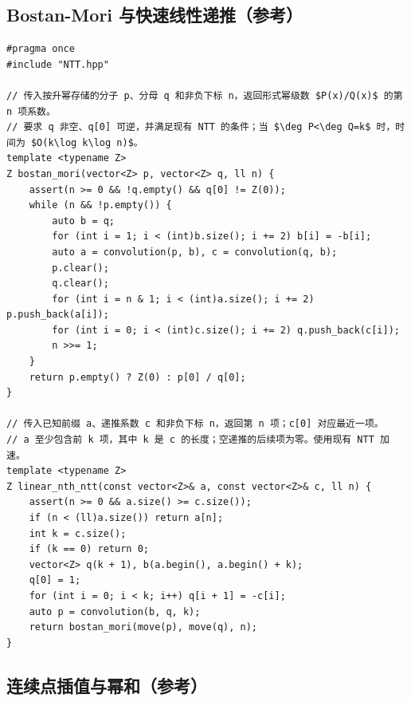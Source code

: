 \subsection{Bostan-Mori 与快速线性递推（参考）}
\par

\begin{lstlisting}
#pragma once
#include "NTT.hpp"

// 传入按升幂存储的分子 p、分母 q 和非负下标 n，返回形式幂级数 $P(x)/Q(x)$ 的第 n 项系数。
// 要求 q 非空、q[0] 可逆，并满足现有 NTT 的条件；当 $\deg P<\deg Q=k$ 时，时间为 $O(k\log k\log n)$。
template <typename Z>
Z bostan_mori(vector<Z> p, vector<Z> q, ll n) {
    assert(n >= 0 && !q.empty() && q[0] != Z(0));
    while (n && !p.empty()) {
        auto b = q;
        for (int i = 1; i < (int)b.size(); i += 2) b[i] = -b[i];
        auto a = convolution(p, b), c = convolution(q, b);
        p.clear();
        q.clear();
        for (int i = n & 1; i < (int)a.size(); i += 2) p.push_back(a[i]);
        for (int i = 0; i < (int)c.size(); i += 2) q.push_back(c[i]);
        n >>= 1;
    }
    return p.empty() ? Z(0) : p[0] / q[0];
}

// 传入已知前缀 a、递推系数 c 和非负下标 n，返回第 n 项；c[0] 对应最近一项。
// a 至少包含前 k 项，其中 k 是 c 的长度；空递推的后续项为零。使用现有 NTT 加速。
template <typename Z>
Z linear_nth_ntt(const vector<Z>& a, const vector<Z>& c, ll n) {
    assert(n >= 0 && a.size() >= c.size());
    if (n < (ll)a.size()) return a[n];
    int k = c.size();
    if (k == 0) return 0;
    vector<Z> q(k + 1), b(a.begin(), a.begin() + k);
    q[0] = 1;
    for (int i = 0; i < k; i++) q[i + 1] = -c[i];
    auto p = convolution(b, q, k);
    return bostan_mori(move(p), move(q), n);
}
\end{lstlisting}

\subsection{连续点插值与幂和（参考）}
\par

